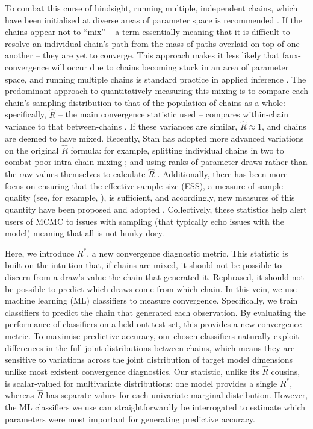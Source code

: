 \documentclass[ba]{imsart}
\numberwithin{equation}{section}
\theoremstyle{plain}
\begin{document}
	To combat this curse of hindsight, running multiple, independent chains, which have been initialised at diverse areas of parameter space is recommended \citep{gelman1992inference}. If the chains appear not to ``mix'' -- a term essentially meaning that it is difficult to resolve an individual chain's path from the mass of paths overlaid on top of one another -- they are yet to converge. This approach makes it less likely that faux-convergence will occur due to chains becoming stuck in an area of parameter space, and running multiple chains is standard practice in applied inference \citep{lambert2018Student}. The predominant approach to quantitatively measuring this mixing is to compare each chain's sampling distribution to that of the population of chains as a whole: specifically, $\widehat{R}$ -- the main convergence statistic used -- compares within-chain variance to that between-chains \citep{gelman1992inference}. If these variances are similar, $\widehat{R}\approx 1$, and chains are deemed to have mixed. Recently, Stan has adopted more advanced variations on the original $\widehat{R}$ formula: for example, splitting individual chains in two to combat poor intra-chain mixing \citep{gelman2013bayesian}; and using ranks of parameter draws rather than the raw values themselves to calculate $\widehat{R}$ \citep{vehtari2019rank}. Additionally, there has been more focus on ensuring that the effective sample size (ESS), a measure of sample quality (see, for example, \cite{lambert2018Student}), is sufficient, and accordingly, new measures of this quantity have been proposed \citep{vehtari2019rank} and adopted \citep{carpenter2017stan}. Collectively, these statistics help alert users of MCMC to issues with sampling (that typically echo issues with the model) meaning that all is not hunky dory.
	
	Here, we introduce $R^*$, a new convergence diagnostic metric. This statistic is built on the intuition that, if chains are mixed, it should not be possible to discern from a draw's value the chain that generated it. Rephrased, it should not be possible to predict which draws come from which chain. In this vein, we use machine learning (ML) classifiers to measure convergence. Specifically, we train classifiers to predict the chain that generated each observation. By evaluating the performance of classifiers on a held-out test set, this provides a new convergence metric. To maximise predictive accuracy, our chosen classifiers naturally exploit differences in the full joint distributions between chains, which means they are sensitive to variations across the joint distribution of target model dimensions unlike most existent convergence diagnostics. Our statistic, unlike its $\widehat{R}$ cousins, is scalar-valued for multivariate distributions: one model provides a single $R^*$, whereas $\widehat{R}$ has separate values for each univariate marginal distribution. However, the ML classifiers we use can straightforwardly be interrogated to estimate which parameters were most important for generating predictive accuracy.
	
\end{document}
